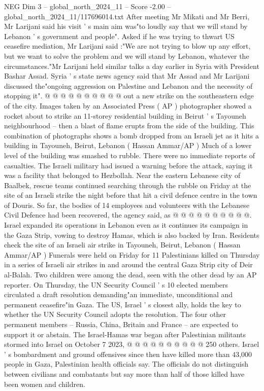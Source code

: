 \begin{textsample}{NEG Dim 3 – global\_north\_2024\_11 – Score -2.00 – global\_north\_2024\_11/117696014.txt}
After meeting Mr Mikati and Mr Berri, Mr Larijani said his visit ' s main aim was"to loudly say that we will stand by Lebanon ' s government and people".
Asked if he was trying to thwart US ceasefire mediation, Mr Larijani said :"We are not trying to blow up any effort, but we want to solve the problem and we will stand by Lebanon, whatever the circumstances."Mr Larijani held similar talks a day earlier in Syria with President Bashar Assad.
Syria ' s state news agency said that Mr Assad and Mr Larijani discussed the"ongoing aggression on Palestine and Lebanon and the necessity of stopping it". @ @ @ @ @ @ @ @ @ @ out a new strike on the southeastern edge of the city.
Images taken by an Associated Press ( AP ) photographer showed a rocket about to strike an 11-storey residential building in Beirut ' s Tayouneh neighbourhood -- then a blast of flame erupts from the side of the building.
This combination of photographs shows a bomb dropped from an Israeli jet as it hits a building in Tayouneh, Beirut, Lebanon ( Hassan Ammar/AP ) Much of a lower level of the building was smashed to rubble.
There were no immediate reports of casualties.
The Israeli military had issued a warning before the attack, saying it was a facility that belonged to Hezbollah.
Near the eastern Lebanese city of Baalbek, rescue teams continued searching through the rubble on Friday at the site of an Israeli strike the night before that hit a civil defence centre in the town of Douris.
So far, the bodies of 14 employees and volunteers with the Lebanese Civil Defence had been recovered, the agency said, as @ @ @ @ @ @ @ @ @ @.
Israel expanded its operations in Lebanon even as it continues its campaign in the Gaza Strip, vowing to destroy Hamas, which is also backed by Iran.
Residents check the site of an Israeli air strike in Tayouneh, Beirut, Lebanon ( Hassan Ammar/AP ) Funerals were held on Friday for 11 Palestinians killed on Thursday in a series of Israeli air strikes in and around the central Gaza Strip city of Deir al-Balah.
Two children were among the dead, seen with the other dead by an AP reporter.
On Thursday, the UN Security Council ' s 10 elected members circulated a draft resolution demanding"an immediate, unconditional and permanent ceasefire"in Gaza.
The US, Israel ' s closest ally, holds the key to whether the UN Security Council adopts the resolution.
The four other permanent members -- Russia, China, Britain and France -- are expected to support it or abstain.
The Israel-Hamas war began after Palestinian militants stormed into Israel on October 7 2023, @ @ @ @ @ @ @ @ @ @ 250 others.
Israel ' s bombardment and ground offensives since then have killed more than 43,000 people in Gaza, Palestinian health officials say.
The officials do not distinguish between civilians and combatants but say more than half of those killed have been women and children.

\end{textsample}

